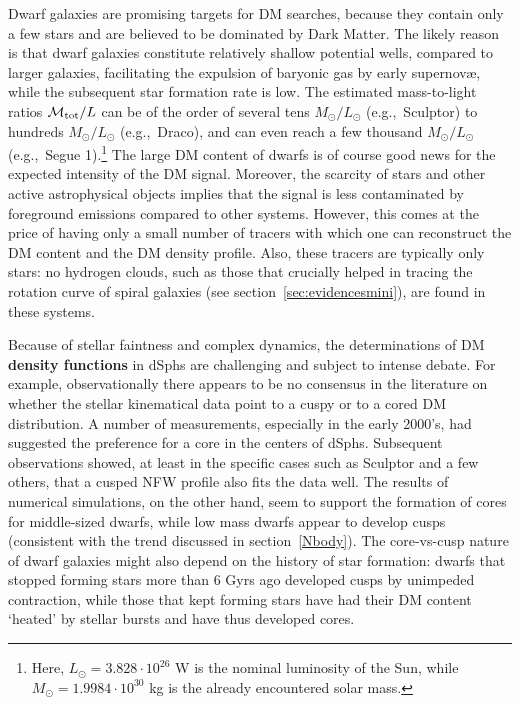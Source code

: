 \medskip


Dwarf galaxies are  promising targets for DM searches, because they contain only a few stars and are believed to be dominated by Dark Matter. 
The likely reason is that dwarf galaxies constitute relatively shallow potential wells, compared to larger galaxies, facilitating the expulsion of baryonic gas by early supernov\ae{}, while 
 the subsequent star formation rate is low. 
 The estimated mass-to-light ratios ${\mathcal{M}} _{\rm tot}/L$  can be of the order of several tens $M_\odot/L_\odot$ (e.g.,~Sculptor) to hundreds $M_\odot/L_\odot$ (e.g.,~Draco), and can even reach a few thousand $M_\odot/L_\odot$ (e.g.,~Segue 1).\footnote{Here, $L_\odot = 3.828 \cdot 10^{26}$ W is the nominal luminosity of the Sun, while $M_\odot = 1.9984 \cdot 10^{30}$ kg is the already encountered solar mass.} 
The large DM content of dwarfs is of course good news for the expected intensity of the DM signal. Moreover, the scarcity of stars and other active astrophysical objects implies that the signal is less contaminated by foreground emissions compared to other systems. However, this comes at the price of having only a small number of tracers with which one can reconstruct the DM content and the DM density profile. Also, these tracers are typically only stars: no hydrogen clouds, such as those that crucially helped in tracing the rotation curve of  spiral galaxies (see section~\ref{sec:evidencesmini}), are found in these systems.

\medskip


Because of stellar faintness and complex dynamics, the determinations of DM {\bf density functions} in dSphs are challenging and subject to intense debate. For example,  observationally there appears to be no consensus in the literature on whether the stellar kinematical data point to a cuspy or to a cored DM distribution.
A number of measurements, especially in the early 2000's, had suggested the preference for a core in the centers of dSphs. 
Subsequent observations showed, at least in the specific cases such as Sculptor and a few others, that a cusped NFW profile also fits the data well. 
The results of numerical simulations, on the other hand, seem to support the formation of cores for middle-sized dwarfs, while low mass dwarfs appear to develop cusps (consistent with the trend discussed in section~\ref{Nbody}). 
The core-vs-cusp  nature of dwarf galaxies might also depend on the history of star formation: dwarfs that stopped forming stars more than 6 Gyrs ago developed cusps by unimpeded contraction, while those that kept forming stars have had their DM content `heated' by stellar bursts and have thus developed cores.

